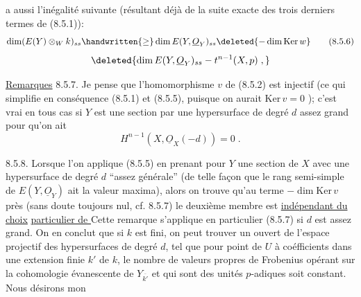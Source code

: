 a aussi l'inégalité suivante (résultant déjà de la suite exacte des trois derniers termes de (8.5.1)):
\[
\dim(E(Y)\otimes_W k)_{ss}\handwritten{\geq}\dim E(Y,\underline O_Y)_{ss}
\deleted{-\dim\mathrm{Ker}\,w}
\tag*{(8.5.6)}
\]
\[
\deleted{\dim E(Y,\underline O_Y)_{ss}-t^{n-1}(X,p)\;,}
\]

\uline{Remarques} 8.5.7. Je pense que l'homomorphisme $v$ de (8.5.2) est injectif\deleted{\unsure{,}} (ce qui simplifie en conséquence (8.5.1) et (8.5.5), puisque on aurait $\mathrm{Ker}\,v=0$ ); c'est vrai en tous cas si  $Y$ est  une section par une hypersurface de degré $d$ assez grand pour qu'on ait
\[
H^{n-1}(X,\underline O_X(-d))=0\;.
\]


8.5.8. Lorsque  l'on applique (8.5.5) en prenant pour $Y$ une section de $X$ avec une hypersurface de degré $d$ ``assez générale'' (de telle façon que le rang semi-simple de $E(Y,\underline O_Y)$ ait la valeur maxima), alors on trouve qu'au terme $-\dim\mathrm{Ker}\,v$ près (sans doute toujours nul, cf. 8.5.7) le deuxième membre est \uline{indépendant du choix}  \uline{particulier de } Cette remarque s'applique en particulier (8.5.7) si $d$ est assez grand. On en conclut que si $k$ est fini,  on peut trouver un ouvert  de l'espace projectif des hypersurfaces de degré $d$, tel que pour   point  de $U$ à coéfficients dans une extension finie $k'$ de $k$, le nombre de valeurs propres de Frobenius opérant sur la cohomologie évanescente de $Y_{\overline{k'}}$ et qui sont des unités $p$-adiques soit constant.  Nous désirons mon%
